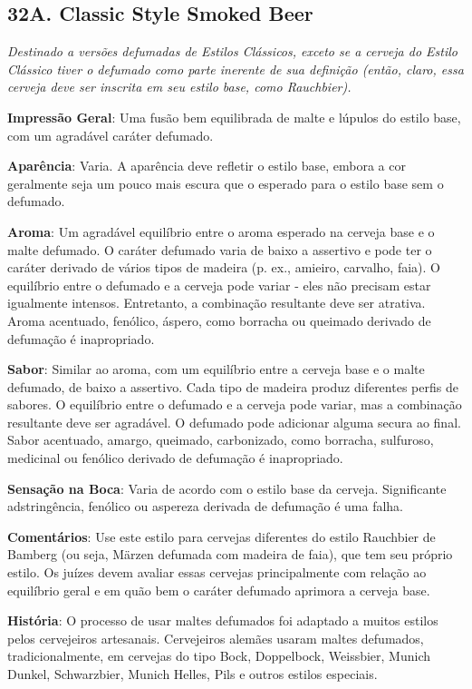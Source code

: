 \subsection*{32A. Classic Style Smoked Beer}

\textit{Destinado a versões defumadas de Estilos Clássicos, exceto se a cerveja do Estilo Clássico tiver o defumado como parte inerente de sua definição (então, claro, essa cerveja deve ser inscrita em seu estilo base, como Rauchbier).}

\textbf{Impressão Geral}: Uma fusão bem equilibrada de malte e lúpulos do estilo base, com um agradável caráter defumado.

\textbf{Aparência}: Varia. A aparência deve refletir o estilo base, embora a cor geralmente seja um pouco mais escura que o esperado para o estilo base sem o defumado.

\textbf{Aroma}: Um agradável equilíbrio entre o aroma esperado na cerveja base e o malte defumado. O caráter defumado varia de baixo a assertivo e pode ter o caráter derivado de vários tipos de madeira (p. ex., amieiro, carvalho, faia). O equilíbrio entre o defumado e a cerveja pode variar - eles não precisam estar igualmente intensos. Entretanto, a combinação resultante deve ser atrativa. Aroma acentuado, fenólico, áspero, como borracha ou queimado derivado de defumação é inapropriado.

\textbf{Sabor}: Similar ao aroma, com um equilíbrio entre a cerveja base e o malte defumado, de baixo a assertivo. Cada tipo de madeira produz diferentes perfis de sabores. O equilíbrio entre o defumado e a cerveja pode variar, mas a combinação resultante deve ser agradável. O defumado pode adicionar alguma secura ao final. Sabor acentuado, amargo, queimado, carbonizado, como borracha, sulfuroso, medicinal ou fenólico derivado de defumação é inapropriado.

\textbf{Sensação na Boca}: Varia de acordo com o estilo base da cerveja. Significante adstringência, fenólico ou aspereza derivada de defumação é uma falha.

\textbf{Comentários}: Use este estilo para cervejas diferentes do estilo Rauchbier de Bamberg (ou seja, Märzen defumada com madeira de faia), que tem seu próprio estilo. Os juízes devem avaliar essas cervejas principalmente com relação ao equilíbrio geral e em quão bem o caráter defumado aprimora a cerveja base.

\textbf{História}: O processo de usar maltes defumados foi adaptado a muitos estilos pelos cervejeiros artesanais. Cervejeiros alemães usaram maltes defumados, tradicionalmente, em cervejas do tipo Bock, Doppelbock, Weissbier, Munich Dunkel, Schwarzbier, Munich Helles, Pils e outros estilos especiais.

